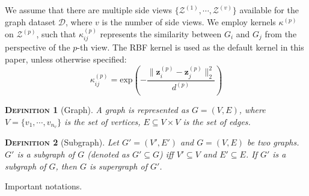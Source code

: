 \documentclass[conference]{IEEEtran}
\newtheorem{Definition}{\textsc{Definition}}
\begin{document}
We assume that there are multiple side views $\{\mathcal{Z}^{(1)},\cdots,\mathcal{Z}^{(v)}\}$ available for the graph dataset $\mathcal{D}$, where $v$ is the number of side views. We employ kernels $\kappa^{(p)}$ on $\mathcal{Z}^{(p)}$, such that $\kappa^{(p)}_{ij}$ represents the similarity between $G_i$ and $G_j$ from the perspective of the $p$-th view.
The RBF kernel is used as the default kernel in this paper, unless otherwise specified:
\begin{equation}
\kappa^{(p)}_{ij}=\text{exp}\left(-\frac{\|\mathbf{z}_i^{(p)}-\mathbf{z}_j^{(p)}\|_2^2}{d^{(p)}}\right)
\label{eq:rbf}
\end{equation}\begin{Definition}[Graph] A graph is represented as $G =(V,E)$, where $V=\{v_1,\cdots,v_{n_v}\}$ is the set of vertices, $E\subseteq V\times V$ is the set of edges.
\end{Definition}\begin{Definition}[Subgraph]
Let $G'=(V',E')$ and $G=(V,E)$ be two graphs. $G'$ is a subgraph of $G$ (denoted as $G'\subseteq G$) iff $V'\subseteq V$ and $E'\subseteq E$. If $G'$ is a subgraph of $G$, then $G$ is supergraph of $G'$.
\end{Definition}%
\centering
\caption{Important notations.}\label{tab_notation}
\end{document}
